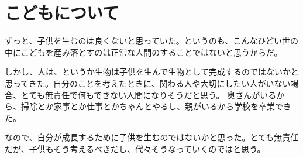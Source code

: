 \chapter{こどもについて}

ずっと、子供を生むのは良くないと思っていた。というのも、こんなひどい世の中にこどもを産み落とすのは正常な人間のすることではないと思うからだ。

しかし、人は、というか生物は子供を生んで生物として完成するのではないかと思ってきた。自分のことを考えたときに、関わる人や大切にしたい人がいない場合、とても無責任で何もできない人間になりそうだと思う。
奥さんがいるから、掃除とか家事とか仕事とかちゃんとやるし、親がいるから学校を卒業できた。

なので、自分が成長するために子供を生むのではないかと思った。とても無責任だが、子供もそう考えるべきだし、代々そうなっていくのではと思う。
